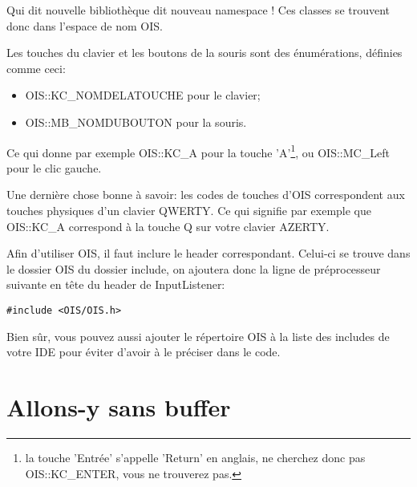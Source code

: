 \documentclass[10pt,a4paper]{report}
\begin{document}
Qui dit nouvelle biblioth\`eque dit nouveau namespace ! Ces classes se trouvent donc dans l'espace de nom OIS.\newline

Les touches du clavier et les boutons de la souris sont des \'enum\'erations, d\'efinies comme ceci:

\begin{itemize}
\item OIS::KC\_NOMDELATOUCHE pour le clavier;
\item OIS::MB\_NOMDUBOUTON pour la souris.
\end{itemize}


Ce qui donne par exemple OIS::KC\_A pour la touche 'A'\footnote{la touche 'Entr\'ee' s'appelle 'Return' en anglais, ne cherchez donc pas OIS::KC\_ENTER, vous ne trouverez pas.}, ou OIS::MC\_Left pour le clic gauche.\newline

Une derni\`ere chose bonne \`{a} savoir: les codes de touches d'OIS correspondent aux touches physiques d'un clavier QWERTY. Ce qui signifie par exemple que OIS::KC\_A correspond \`{a} la touche Q sur votre clavier AZERTY.\newline

Afin d'utiliser OIS, il faut inclure le header correspondant. Celui-ci se trouve dans le dossier OIS du dossier include, on ajoutera donc la ligne de pr\'eprocesseur suivante en t\^ete du header de InputListener:

\begin{lstlisting}[caption={Include OIS}]
#include <OIS/OIS.h>
\end{lstlisting}

Bien s\^ur, vous pouvez aussi ajouter le r\'epertoire OIS \`{a} la liste des includes de votre IDE pour \'eviter d'avoir \`{a} le pr\'eciser dans le code.




























\section{Allons-y sans buffer}
\end{document}
